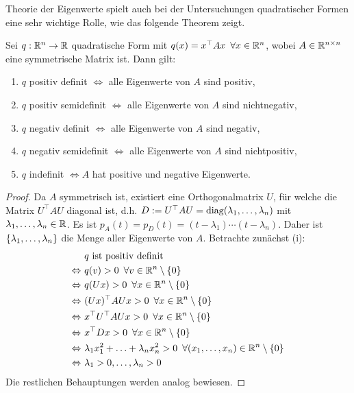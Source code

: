 Theorie der Eigenwerte spielt auch bei der Untersuchungen quadratischer Formen eine sehr wichtige Rolle, wie das folgende Theorem zeigt. 

\begin{thm}
	Sei $ q : \mathbb R^n \to \mathbb R $ quadratische Form mit $ q(x) = x^\top Ax \enspace \forall x \in \mathbb R^n $, wobei $ A \in \mathbb R^{n \times n} $ eine symmetrische Matrix ist. Dann gilt:
	\begin{enumerate}
		\item
			$ q $ positiv definit $ \Leftrightarrow $ alle Eigenwerte von $ A $ sind positiv,
		\item
			$ q $ positiv semidefinit $ \Leftrightarrow $ alle Eigenwerte von $ A $ sind nichtnegativ,
		\item
			$ q $ negativ definit $ \Leftrightarrow $ alle Eigenwerte von $ A $ sind negativ,
		\item
			$ q $ negativ semidefinit $ \Leftrightarrow $ alle Eigenwerte von $ A $ sind nichtpositiv,
		\item
			$ q $ indefinit $ \Leftrightarrow A $ hat positive und negative Eigenwerte.
	\end{enumerate}
\end{thm}

\begin{proof} 
	Da $ A $ symmetrisch ist, existiert eine Orthogonalmatrix $ U $, für welche die Matrix $ U^\top A U $ diagonal ist, d.h. $ D := U^\top A U = \operatorname{diag}(\lambda_1, \ldots, \lambda_n) $ mit $ \lambda_1, \ldots, \lambda_n \in \mathbb R $. Es ist $ p_A(t) = p_D(t) = (t-\lambda_1) \cdots (t-\lambda_n) $. Daher ist $ \left\{ \lambda_1, \ldots, \lambda_n \right\} $ die Menge aller Eigenwerte von $ A $. Betrachte zunächst (i):
	\begin{align*}
		&\ q \text{ ist positiv definit} \\
		\Leftrightarrow&\ q(v) > 0 \enspace \forall v \in \mathbb R^n \setminus \left\{ 0 \right\} \\
		\Leftrightarrow&\ q(Ux) > 0 \enspace \forall x \in \mathbb R^n \setminus \left\{ 0 \right\} \\
		\Leftrightarrow&\ (Ux)^\top AUx > 0 \enspace \forall x \in \mathbb R^n \setminus \left\{ 0 \right\} \\
		\Leftrightarrow&\ x^\top U^\top AU x > 0 \enspace \forall x \in \mathbb R^n \setminus \left\{ 0 \right\} \\
		\Leftrightarrow&\ x^\top D x > 0 \enspace \forall x \in \mathbb R^n \setminus \left\{ 0 \right\} \\
		\Leftrightarrow&\ \lambda_1x_1^2 + \ldots + \lambda_nx_n^2 > 0 \enspace \forall (x_1, \ldots, x_n) \in \mathbb R^n \setminus \left\{ 0 \right\} \\
		\Leftrightarrow&\ \lambda_1 > 0, \ldots, \lambda_n > 0
	\end{align*}
	Die restlichen Behauptungen werden analog bewiesen.
\end{proof}

